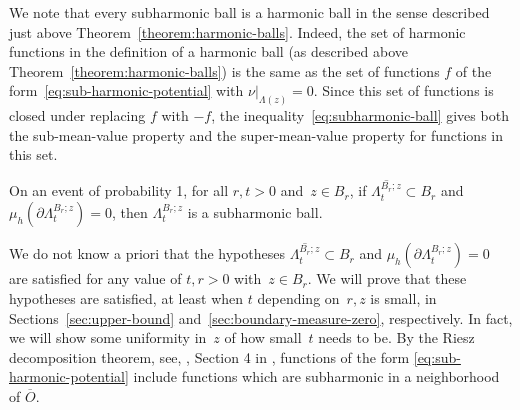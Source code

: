 \documentclass[12pt]{amsart}
\numberwithin{equation}{section}
\newcommand{\cluster}[2]{\hyperref[eq:non-co-set]{\mathit{\Lambda}^{#1}_{#2}}}
\begin{document}
	We note that every subharmonic ball is a harmonic ball in the sense described just above Theorem~\ref{theorem:harmonic-balls}. Indeed, the set of harmonic functions in the definition of a harmonic ball (as described above Theorem~\ref{theorem:harmonic-balls}) is the same as the set of functions $f$ of the form~\eqref{eq:sub-harmonic-potential} with $\nu|_{\Lambda(z)}=0$. Since this set of functions is closed under replacing $f$ with $-f$, the inequality~\eqref{eq:subharmonic-ball} gives both the sub-mean-value property and the super-mean-value property for functions in this set.
	
	\begin{lemma} \label{lemma:harmonic-ball}
		On an event of probability 1, for all $r,t > 0$ and~$z \in B_r$, if  $\overline{{{\cluster{B_r;z}{t}}}} \subset B_r$ and $\mu_h(\partial {\cluster{B_r;z}{t}}) = 0$, 
		then ${\cluster{B_r;z}{t}}$ is a subharmonic ball. 
	\end{lemma}
	
	We do not know a priori that the hypotheses $\overline{{{\cluster{B_r;z}{t}}}} \subset B_r$ and $\mu_h(\partial{\cluster{B_r;z}{t}}) = 0$ are satisfied for any value of $t, r>0$ with~$z \in B_r$. We will prove that these hypotheses are satisfied, at least when $t$ depending on~$r, z$ is small, in Sections~\ref{sec:upper-bound} and~\ref{sec:boundary-measure-zero}, respectively. In fact, we will show some uniformity in~$z$ of how small~$t$ needs to be.
	By the Riesz decomposition theorem, see, \eg, Section 4 in \cite{armitage2000classical}, functions of the form \eqref{eq:sub-harmonic-potential}
	include functions which are subharmonic in a neighborhood of $\overline{O}$.
	
\end{document}

